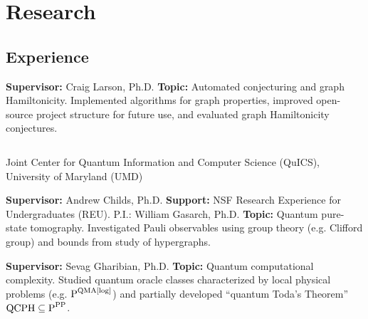 \documentclass[11pt,letterpaper,serif]{moderncv}
\begin{document}

\section{Research}
\subsection{Experience}
{	
	\begin{adjustwidth}{.25in}{}
		\textbf{Supervisor:} Craig Larson, Ph.D. \newline
		\textbf{Topic:} Automated conjecturing and graph Hamiltonicity. Implemented algorithms for graph properties, improved open-source project structure for future use, and evaluated graph Hamiltonicity conjectures.
	\end{adjustwidth}
}

{
	$\!$\begin{minipage}{0.8\textwidth}
		Joint Center for Quantum Information and Computer Science (QuICS), \newline
		University of Maryland (UMD)	
	\end{minipage}
}
{}{}
{	
	\begin{adjustwidth}{.25in}{}
		\textbf{Supervisor:} Andrew Childs, Ph.D. \newline
		\textbf{Support:} NSF Research Experience for Undergraduates (REU). P.I.: William Gasarch, Ph.D. \newline
		\textbf{Topic:} Quantum pure-state tomography. Investigated Pauli observables using group theory (e.g. Clifford group) and bounds from study of hypergraphs.
	\end{adjustwidth}
}

{
	\begin{adjustwidth}{.25in}{}
		\textbf{Supervisor:} Sevag Gharibian, Ph.D. \newline
		\textbf{Topic:} Quantum computational complexity. Studied quantum oracle classes characterized by local physical problems (e.g. \href{https://complexityzoo.uwaterloo.ca/Complexity_Zoo:P\#pqmalog}{$\textup{P}^{\textup{QMA[log]}}$}) and partially developed ``quantum Toda's Theorem'' $\textup{QCPH}\subseteq \textup{P}^{\textup{PP}}$.
	\end{adjustwidth}
}
\end{document}
